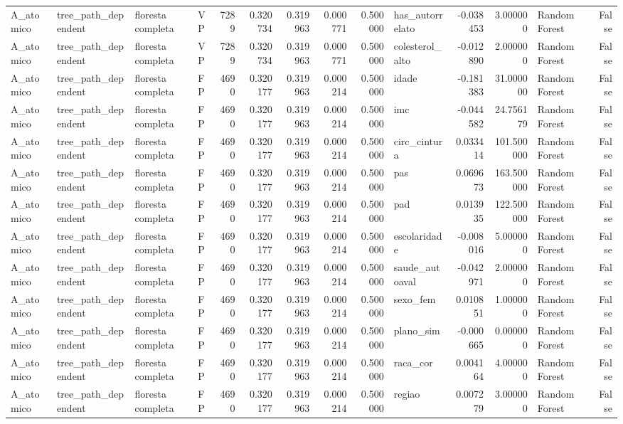 \begin{tabular}{llllrrrrrlrrlr}
A_atomico & tree_path_dependent & floresta completa & VP & 7289 & 0.320734 & 0.319963 & 0.000771 & 0.500000 & has_autorrelato & -0.038453 & 3.000000 & Random Forest & False \\
A_atomico & tree_path_dependent & floresta completa & VP & 7289 & 0.320734 & 0.319963 & 0.000771 & 0.500000 & colesterol_alto & -0.012890 & 2.000000 & Random Forest & False \\
A_atomico & tree_path_dependent & floresta completa & FP & 4690 & 0.320177 & 0.319963 & 0.000214 & 0.500000 & idade & -0.181383 & 31.000000 & Random Forest & False \\
A_atomico & tree_path_dependent & floresta completa & FP & 4690 & 0.320177 & 0.319963 & 0.000214 & 0.500000 & imc & -0.044582 & 24.756179 & Random Forest & False \\
A_atomico & tree_path_dependent & floresta completa & FP & 4690 & 0.320177 & 0.319963 & 0.000214 & 0.500000 & circ_cintura & 0.033414 & 101.500000 & Random Forest & False \\
A_atomico & tree_path_dependent & floresta completa & FP & 4690 & 0.320177 & 0.319963 & 0.000214 & 0.500000 & pas & 0.069673 & 163.500000 & Random Forest & False \\
A_atomico & tree_path_dependent & floresta completa & FP & 4690 & 0.320177 & 0.319963 & 0.000214 & 0.500000 & pad & 0.013935 & 122.500000 & Random Forest & False \\
A_atomico & tree_path_dependent & floresta completa & FP & 4690 & 0.320177 & 0.319963 & 0.000214 & 0.500000 & escolaridade & -0.008016 & 5.000000 & Random Forest & False \\
A_atomico & tree_path_dependent & floresta completa & FP & 4690 & 0.320177 & 0.319963 & 0.000214 & 0.500000 & saude_autoaval & -0.042971 & 2.000000 & Random Forest & False \\
A_atomico & tree_path_dependent & floresta completa & FP & 4690 & 0.320177 & 0.319963 & 0.000214 & 0.500000 & sexo_fem & 0.010851 & 1.000000 & Random Forest & False \\
A_atomico & tree_path_dependent & floresta completa & FP & 4690 & 0.320177 & 0.319963 & 0.000214 & 0.500000 & plano_sim & -0.000665 & 0.000000 & Random Forest & False \\
A_atomico & tree_path_dependent & floresta completa & FP & 4690 & 0.320177 & 0.319963 & 0.000214 & 0.500000 & raca_cor & 0.004164 & 4.000000 & Random Forest & False \\
A_atomico & tree_path_dependent & floresta completa & FP & 4690 & 0.320177 & 0.319963 & 0.000214 & 0.500000 & regiao & 0.007279 & 3.000000 & Random Forest & False \\

\end{tabular}
